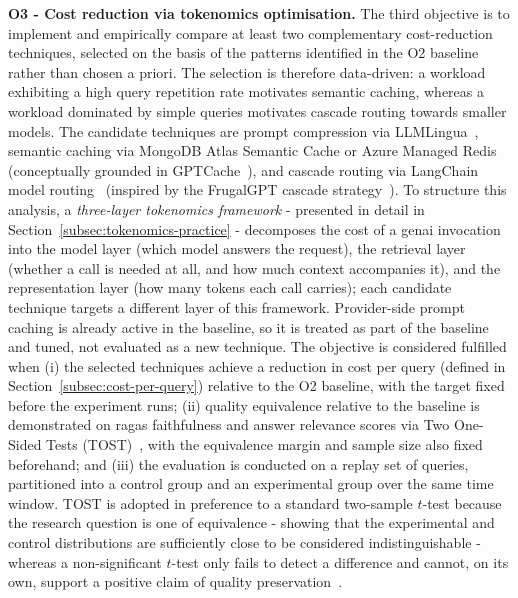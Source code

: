 \textbf{O3 - Cost reduction via tokenomics optimisation.} The third objective
is to implement and empirically compare at least two complementary
cost-reduction techniques, selected on the basis of the patterns identified in
the O2 baseline rather than chosen a priori. The selection is therefore
data-driven: a workload exhibiting a high query repetition rate motivates
semantic caching, whereas a workload dominated by simple queries motivates
cascade routing towards smaller models. The candidate techniques are prompt
compression via LLMLingua~\cite{jiang2023llmlingua}, semantic caching via
MongoDB Atlas Semantic Cache or Azure Managed Redis (conceptually grounded in
GPTCache~\cite{bang2023gptcache}), and cascade routing via LangChain model
routing~\cite{chase2022langchain} (inspired by the FrugalGPT cascade
strategy~\cite{chen2023frugalgpt}). To structure this analysis, a \emph{three-layer tokenomics framework} - presented in detail in Section~\ref{subsec:tokenomics-practice} - decomposes the cost of a \gls{genai}
invocation into the model layer (which model answers the request), the
retrieval layer (whether a call is needed at all, and how much context
accompanies it), and the representation layer (how many tokens each call
carries); each candidate technique targets a different layer of this
framework. Provider-side prompt caching is already active in the baseline, so
it is treated as part of the baseline and tuned, not evaluated as a new technique.
The objective is considered fulfilled when (i) the selected techniques achieve a reduction in cost per query (defined in Section~\ref{subsec:cost-per-query}) relative to the O2 baseline, with the target fixed before the experiment runs; (ii) quality equivalence relative to the baseline is demonstrated on \gls{ragas} faithfulness and
answer relevance scores via Two One-Sided Tests (TOST)~\cite{lakens_2017_tost}, with the equivalence margin and sample size also fixed beforehand; and (iii) the evaluation is conducted on a replay set of queries,
partitioned into a control group and an experimental group over the same time window. TOST is
adopted in preference to a standard two-sample $t$-test because the research
question is one of equivalence - showing that the experimental and control
distributions are sufficiently close to be considered indistinguishable -
whereas a non-significant $t$-test only fails to detect a difference and
cannot, on its own, support a positive claim of quality
preservation~\cite{lakens_scheel_isager_2018}.

